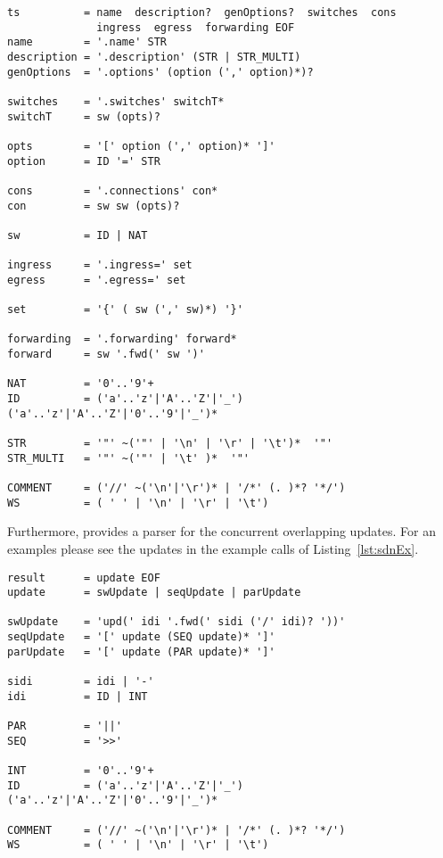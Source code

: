 \documentclass[12pt,twoside,a4paper,openright]{memoir}
\begin{document}
\begin{lstlisting}[captionpos=b, caption=Grammar of the topology and the initial configuration of SDNs., label = lst:grammar,language=ebnf]
ts			= name  description?  genOptions?  switches  cons
			  ingress  egress  forwarding EOF
name		= '.name' STR
description	= '.description' (STR | STR_MULTI)
genOptions  = '.options' (option (',' option)*)?

switches	= '.switches' switchT*
switchT		= sw (opts)?

opts		= '[' option (',' option)* ']'
option		= ID '=' STR

cons		= '.connections' con*
con			= sw sw (opts)?

sw			= ID | NAT

ingress     = '.ingress=' set
egress      = '.egress=' set

set         = '{' ( sw (',' sw)*) '}'

forwarding  = '.forwarding' forward*
forward     = sw '.fwd(' sw ')'

NAT         = '0'..'9'+
ID			= ('a'..'z'|'A'..'Z'|'_') ('a'..'z'|'A'..'Z'|'0'..'9'|'_')*

STR			= '"' ~('"' | '\n' | '\r' | '\t')*  '"'
STR_MULTI	= '"' ~('"' | '\t' )*  '"'

COMMENT		= ('//' ~('\n'|'\r')* | '/*' (. )*? '*/')
WS		    = ( ' ' | '\n' | '\r' | '\t')
\end{lstlisting}
Furthermore, \tool{} provides a parser for the concurrent overlapping updates.
For an examples please see the updates in the example calls of Listing~\ref{lst:sdnEx}.
\begin{lstlisting}[captionpos=b, caption=Grammar of the concurrent overlapping updates of SDNs., label = lst:grammar,language=ebnf]
result     	= update EOF
update      = swUpdate | seqUpdate | parUpdate

swUpdate    = 'upd(' idi '.fwd(' sidi ('/' idi)? '))'
seqUpdate   = '[' update (SEQ update)* ']'
parUpdate   = '[' update (PAR update)* ']'

sidi		= idi | '-'
idi 		= ID | INT

PAR 		= '||'
SEQ 		= '>>'

INT			= '0'..'9'+
ID  		= ('a'..'z'|'A'..'Z'|'_') ('a'..'z'|'A'..'Z'|'0'..'9'|'_')*

COMMENT		= ('//' ~('\n'|'\r')* | '/*' (. )*? '*/')
WS			= ( ' ' | '\n' | '\r' | '\t')
\end{lstlisting}
\end{document}
